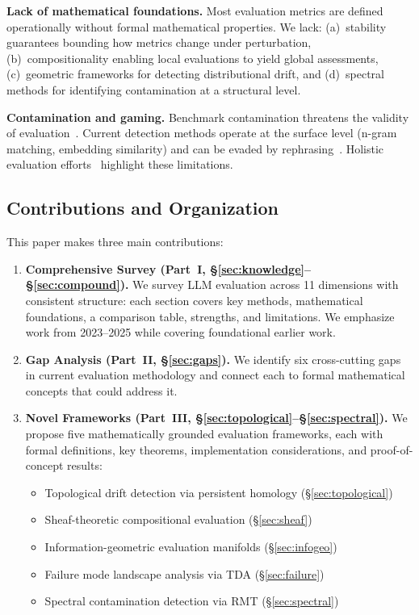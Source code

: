 \documentclass[11pt]{article}
\begin{document}
\textbf{Lack of mathematical foundations.} Most evaluation metrics are defined operationally without formal mathematical properties. We lack: (a)~stability guarantees bounding how metrics change under perturbation, (b)~compositionality enabling local evaluations to yield global assessments, (c)~geometric frameworks for detecting distributional drift, and (d)~spectral methods for identifying contamination at a structural level.

\textbf{Contamination and gaming.} Benchmark contamination threatens the validity of evaluation~\cite{shi2023detecting,yang2023rethinking,xu2024contamination}. Current detection methods operate at the surface level (n-gram matching, embedding similarity) and can be evaded by rephrasing~\cite{yang2023rethinking}. Holistic evaluation efforts~\cite{liang2022helm,qin2023chatgpt} highlight these limitations.

\subsection{Contributions and Organization}

This paper makes three main contributions:

\begin{enumerate}[leftmargin=*]
\item \textbf{Comprehensive Survey (Part~I, \S\ref{sec:knowledge}--\S\ref{sec:compound}).} We survey LLM evaluation across 11 dimensions with consistent structure: each section covers key methods, mathematical foundations, a comparison table, strengths, and limitations. We emphasize work from 2023--2025 while covering foundational earlier work.

\item \textbf{Gap Analysis (Part~II, \S\ref{sec:gaps}).} We identify six cross-cutting gaps in current evaluation methodology and connect each to formal mathematical concepts that could address it.

\item \textbf{Novel Frameworks (Part~III, \S\ref{sec:topological}--\S\ref{sec:spectral}).} We propose five mathematically grounded evaluation frameworks, each with formal definitions, key theorems, implementation considerations, and proof-of-concept results:
\begin{itemize}[leftmargin=*]
\item Topological drift detection via persistent homology (\S\ref{sec:topological})
\item Sheaf-theoretic compositional evaluation (\S\ref{sec:sheaf})
\item Information-geometric evaluation manifolds (\S\ref{sec:infogeo})
\item Failure mode landscape analysis via TDA (\S\ref{sec:failure})
\item Spectral contamination detection via RMT (\S\ref{sec:spectral})
\end{itemize}
\end{enumerate}
\end{document}
